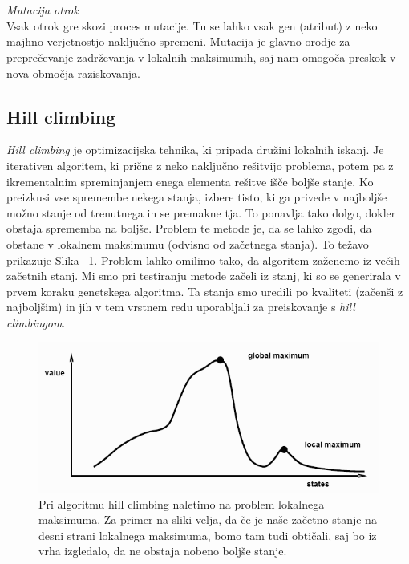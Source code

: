\documentclass[12pt,a4paper,openany]{book}
\begin{document}
\\\\
\textit{Mutacija otrok}\\
Vsak otrok gre skozi proces mutacije. Tu se lahko vsak gen (atribut) z neko majhno verjetnostjo naključno spremeni. Mutacija je glavno orodje za preprečevanje zadrževanja v lokalnih maksimumih, saj nam omogoča preskok v nova območja raziskovanja.

\subsection{Hill climbing}
\textit{Hill climbing} je optimizacijska tehnika, ki pripada družini lokalnih iskanj. Je iterativen algoritem, ki prične z neko naključno rešitvijo problema, potem pa z ikrementalnim spreminjanjem enega elementa rešitve išče boljše stanje. Ko preizkusi vse spremembe nekega stanja, izbere tisto, ki ga privede v najboljše možno stanje od trenutnega in se premakne tja. To ponavlja tako dolgo, dokler obstaja sprememba na boljše. Problem te metode je, da se lahko zgodi, da obstane v lokalnem maksimumu (odvisno od začetnega stanja). To težavo prikazuje Slika ~\ref{fig:hill}. Problem lahko omilimo tako, da algoritem zaženemo iz večih začetnih stanj. Mi smo pri testiranju metode začeli iz stanj, ki so se generirala v prvem koraku genetskega algoritma. Ta stanja smo uredili po kvaliteti (začenši z najboljšim) in jih v tem vrstnem redu uporabljali za preiskovanje s \textit{hill climbingom}.

\begin{figure}[ht]
 \centering
 \includegraphics[width=12cm]{localmax.png}
 \caption[Problem lokalnega maksimuma]{Pri algoritmu hill climbing naletimo na problem lokalnega maksimuma. Za primer na sliki velja, da če je naše začetno stanje na desni strani lokalnega maksimuma, bomo tam tudi obtičali, saj bo iz vrha izgledalo, da ne obstaja nobeno boljše stanje.}
 \label{fig:hill}
\end{figure}
\end{document}
